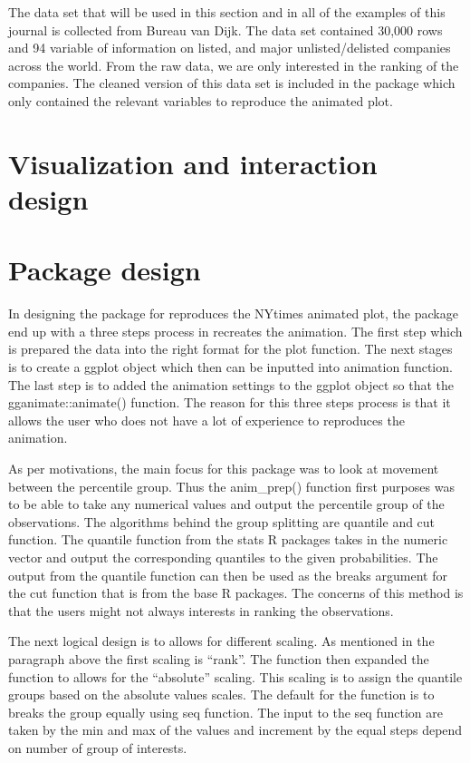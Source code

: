 The data set that will be used in this section and in all of the examples of this journal is collected from Bureau van Dijk. The data set contained 30,000 rows and 94 variable of information on listed, and major unlisted/delisted companies across the world. From the raw data, we are only interested in the ranking of the companies. The cleaned version of this data set is included in the package which only contained the relevant variables to reproduce the animated plot.

\hypertarget{visualization-and-interaction-design}{%
\section{Visualization and interaction design}\label{visualization-and-interaction-design}}

\hypertarget{package-design}{%
\section{Package design}\label{package-design}}

In designing the package for reproduces the NYtimes animated plot, the package end up with a three steps process in recreates the animation. The first step which is prepared the data into the right format for the plot function. The next stages is to create a ggplot object which then can be inputted into animation function. The last step is to added the animation settings to the ggplot object so that the gganimate::animate() function. The reason for this three steps process is that it allows the user who does not have a lot of experience to reproduces the animation.

As per motivations, the main focus for this package was to look at movement between the percentile group. Thus the anim\_prep() function first purposes was to be able to take any numerical values and output the percentile group of the observations. The algorithms behind the group splitting are quantile and cut function. The quantile function from the stats R packages takes in the numeric vector and output the corresponding quantiles to the given probabilities. The output from the quantile function can then be used as the breaks argument for the cut function that is from the base R packages. The concerns of this method is that the users might not always interests in ranking the observations.

The next logical design is to allows for different scaling. As mentioned in the paragraph above the first scaling is ``rank''. The function then expanded the function to allows for the ``absolute'' scaling. This scaling is to assign the quantile groups based on the absolute values scales. The default for the function is to breaks the group equally using seq function. The input to the seq function are taken by the min and max of the values and increment by the equal steps depend on number of group of interests.


